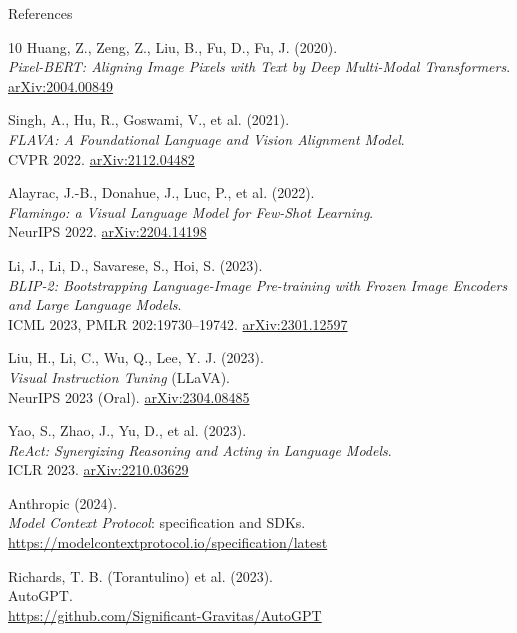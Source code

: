\begin{frame}[allowframebreaks]{References}
\begin{thebibliography}{10}
      Huang, Z., Zeng, Z., Liu, B., Fu, D., Fu, J. (2020). \\
      \emph{Pixel-BERT: Aligning Image Pixels with Text by Deep Multi-Modal Transformers}.\\
      \href{https://arxiv.org/abs/2004.00849}{arXiv:2004.00849}

      Singh, A., Hu, R., Goswami, V., et al. (2021). \\
      \emph{FLAVA: A Foundational Language and Vision Alignment Model}.\\
      CVPR 2022. \href{https://arxiv.org/abs/2112.04482}{arXiv:2112.04482}

      Alayrac, J.-B., Donahue, J., Luc, P., et al. (2022). \\
      \emph{Flamingo: a Visual Language Model for Few-Shot Learning}.\\
      NeurIPS 2022. \href{https://arxiv.org/abs/2204.14198}{arXiv:2204.14198}

      Li, J., Li, D., Savarese, S., Hoi, S. (2023). \\
      \emph{BLIP-2: Bootstrapping Language-Image Pre-training with Frozen Image Encoders and Large Language Models}.\\
      ICML 2023, PMLR 202:19730--19742. \href{https://arxiv.org/abs/2301.12597}{arXiv:2301.12597}

      Liu, H., Li, C., Wu, Q., Lee, Y. J. (2023). \\
      \emph{Visual Instruction Tuning} (LLaVA).\\
      NeurIPS 2023 (Oral). \href{https://arxiv.org/abs/2304.08485}{arXiv:2304.08485}

      Yao, S., Zhao, J., Yu, D., et al. (2023). \\
      \emph{ReAct: Synergizing Reasoning and Acting in Language Models}.\\
      ICLR 2023. \href{https://arxiv.org/abs/2210.03629}{arXiv:2210.03629}

      Anthropic (2024). \\
      \emph{Model Context Protocol}: specification and SDKs.\\
      \href{https://modelcontextprotocol.io/specification/latest}{https://modelcontextprotocol.io/specification/latest}

      Richards, T. B. (Torantulino) et al. (2023). \\
      AutoGPT.\\
      \href{https://github.com/Significant-Gravitas/AutoGPT}{https://github.com/Significant-Gravitas/AutoGPT}


\end{thebibliography}
\end{frame}
